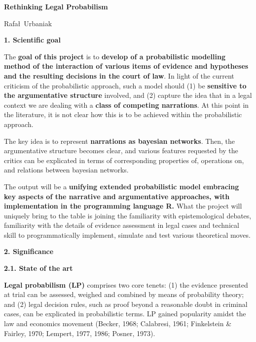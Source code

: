 \documentclass[11pt,dvipsnames,enabledeprecatedfontcommands]{scrartcl}
\author{}
\date{\vspace{-2.5em}}
\begin{document}
\begin{center}
\Large {\sc \textbf{Rethinking Legal Probabilism}}

\large Rafa\l\, Urbaniak
\end{center}

\vspace{2mm}

\thispagestyle{empty}

\noindent \Large \textbf{1. Scientific goal} \normalsize

\vspace{1mm}

The \textbf{goal of this project} is to
\textbf{develop of a probabilistic  modelling method of the  interaction of various items of evidence and hypotheses and the resulting decisions in the court of law}.
In light of the current criticism of the probabilistic approach, such a
model should (1) be \textbf{sensitive to the argumentative structure}
involved, and (2) capture the idea that in a legal context we are
dealing with a \textbf{class of competing narrations}. At this point in
the literature, it is not clear how this is to be achieved within the
probabilistic approach.

The key idea is to represent \textbf{narrations  as bayesian networks}.
Then, the argumentative structure becomes clear, and various features
requested by the critics can be explicated in terms of corresponding
properties of, operations on, and relations between bayesian networks.

The output will be a
\textbf{unifying extended probabilistic model embracing key aspects of the narrative and argumentative approaches, with  implementation in the programming language \textbf{\textsf{R}}.}
What the project will uniquely bring to the table is joining the
familiarity with epistemological debates, familiarity with the details
of evidence assessment in legal cases and technical skill to
programmatically implement, simulate and test various theoretical moves.

\vspace{2mm}

\noindent \Large \textbf{2. Significance} \normalsize

\vspace{1mm}

\noindent \large \textbf{2.1. State of the art}

\normalsize 

\vspace{1mm}

\textbf{Legal probabilism (LP)} comprises two core tenets: (1) the
evidence presented at trial can be assessed, weighed and combined by
means of probability theory; and (2) legal decision rules, such as proof
beyond a reasonable doubt in criminal cases, can be explicated in
probabilistic terms. LP gained popularity amidst the law and economics
movement (Becker, 1968; Calabresi, 1961; Finkelstein \& Fairley, 1970;
Lempert, 1977, 1986; Posner, 1973).
\end{document}
